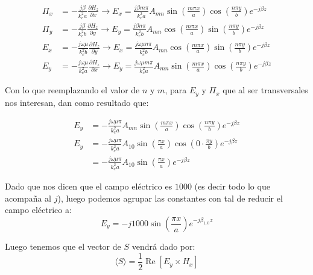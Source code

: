 \documentclass[
  11pt,
  letterpaper,
   addpoints,
   answers
  ]{exam}
\begin{document}
\begin{questions}
\begin{solution}
\begin{align}
    \Pi_x &= -\frac{j\beta}{k_c^2 a} \frac{\partial H_z}{\partial x} \rightarrow 
        E_x = \frac{j\beta m \pi}{k_c^2 a} A_{mn} \sin\left( \frac{m\pi x}{a} \right) \cos\left( \frac{n\pi y}{b} \right) e^{-j\beta z} \\
    \Pi_y &= -\frac{j\beta}{k_c^2 b} \frac{\partial H_z}{\partial y} \rightarrow 
        E_y = \frac{j\beta n \pi}{k_c^2 b} A_{mn} \cos\left( \frac{m\pi x}{a} \right) \sin\left( \frac{n\pi y}{b} \right) e^{-j\beta z} \\
    E_x &= -\frac{j\omega\mu}{k_c^2 b} \frac{\partial H_z}{\partial y} \rightarrow 
        E_x = \frac{j\omega\mu n\pi}{k_c^2 b} A_{mn} \cos\left( \frac{m\pi x}{a} \right) \sin\left( \frac{n\pi y}{b} \right) e^{-j\beta z} \\
    E_y &= -\frac{j\omega\mu}{k_c^2 a} \frac{\partial H_z}{\partial x} \rightarrow 
        E_y = \frac{j\omega\mu m\pi}{k_c^2 a} A_{mn} \sin\left( \frac{m\pi x}{a} \right) \cos\left( \frac{n\pi y}{b} \right) e^{-j\beta z}
\end{align}

Con lo que reemplazando el valor de $n$ y $m$, para $E_y$ y $\Pi_x$ que al ser transversales nos interesan, dan como resultado que:

\begin{align}
    E_y &= -\frac{j\omega\mu\pi}{k_c^2 a} A_{mn} \sin\left( \frac{m\pi x}{a} \right) \cos\left( \frac{n\pi y}{b} \right) e^{-j\beta z} \tag{100} \\
    E_y &= -\frac{j\omega\mu\pi}{k_c^2 a} A_{10} \sin\left( \frac{\pi x}{a} \right) \cos\left( 0 \cdot \frac{\pi y}{b} \right) e^{-j\beta z} \tag{101} \\
        &= -\frac{j\omega\mu\pi}{k_c^2 a} A_{10} \sin\left( \frac{\pi x}{a} \right) e^{-j\beta z} \tag{102}
\end{align}

Dado que nos dicen que el campo eléctrico es $1000$ (es decir todo lo que acompaña al $j$), luego podemos agrupar las constantes con tal de reducir el campo eléctrico a:
\begin{equation}
    E_y = -j1000 \sin\left( \frac{\pi x}{a} \right) e^{-j\beta_{1,0} z} \tag{103}
\end{equation}

Luego tenemos que el vector de $S$ vendrá dado por:
\begin{equation}
    \langle S \rangle = \frac{1}{2} \operatorname{Re} \left[ E_y \times H_x \right] \tag{104}
\end{equation}


\end{solution}
\end{questions}
\end{document}
